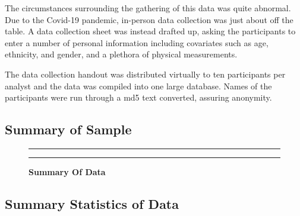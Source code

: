 \documentclass[]{article}
\begin{document}
The circumstances surrounding the gathering of this data was quite
abnormal. Due to the Covid-19 pandemic, in-person data collection was
just about off the table. A data collection sheet was instead drafted
up, asking the participants to enter a number of personal information
including covariates such as age, ethnicity, and gender, and a plethora
of physical measurements.

The data collection handout was distributed virtually to ten
participants per analyst and the data was compiled into one large
database. Names of the participants were run through a md5 text
converted, assuring anonymity.

\subsection{Summary of Sample}
\label{sec:data-sample}

\begin{figure}[!ht]
    \hrule
    \caption{ \textbf{Summary Of Data} }
    \begin{center}
    \end{center}
    \label{fig:summary}
    \hrule
\end{figure}
\newpage

\subsection{Summary Statistics of Data}
\label{sec:data-summary}
\end{document}
